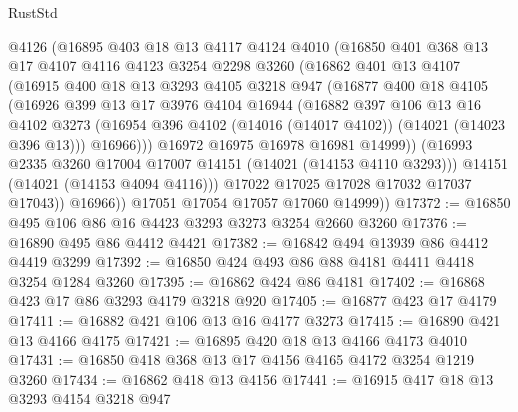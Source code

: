 \begin{lexlean}{RustStd}
\begin{coremodule}
{\begin{coremodule}
{{{{{{{{{{{{{{{{{{{{{{{{{{{{{{{{{{{{{{{              @4126
              (@16895
                @403
                @18
                @13
                @4117
                @4124
                @4010
                (@16850
                  @401
                  @368
                  @13
                  @17
                  @4107
                  @4116
                  @4123
                  @3254
                  @2298
                  @3260
                  (@16862
                    @401
                    @13
                    @4107
                    (@16915
                      @400
                      @18
                      @13
                      @3293
                      @4105
                      @3218
                      @947
                      (@16877
                        @400
                        @18
                        @4105
                        (@16926
                          @399
                          @13
                          @17
                          @3976
                          @4104
                          @16944
                          (@16882
                            @397
                            @106
                            @13
                            @16
                            @4102
                            @3273
                            (@16954 @396 @4102 (@14016 (@14017 @4102)) (@14021 (@14023 @396 @13)))
                            @16966)))
                      @16972
                      @16975
                      @16978
                      @16981
                      @14999))
                  (@16993 @2335 @3260 @17004 @17007 @14151 (@14021 (@14153 @4110 @3293)))
                  @14151
                  (@14021 (@14153 @4094 @4116)))
                @17022
                @17025
                @17028
                @17032
                @17037
                @17043))
            @16966))
        @17051
        @17054
        @17057
        @17060
        @14999))
@17372 := @16850 @495 @106 @86 @16 @4423 @3293 @3273 @3254 @2660 @3260
@17376 := @16890 @495 @86 @4412 @4421
@17382 := @16842 @494 @13939 @86 @4412 @4419 @3299
@17392 := @16850 @424 @493 @86 @88 @4181 @4411 @4418 @3254 @1284 @3260
@17395 := @16862 @424 @86 @4181
@17402 := @16868 @423 @17 @86 @3293 @4179 @3218 @920
@17405 := @16877 @423 @17 @4179
@17411 := @16882 @421 @106 @13 @16 @4177 @3273
@17415 := @16890 @421 @13 @4166 @4175
@17421 := @16895 @420 @18 @13 @4166 @4173 @4010
@17431 := @16850 @418 @368 @13 @17 @4156 @4165 @4172 @3254 @1219 @3260
@17434 := @16862 @418 @13 @4156
@17441 := @16915 @417 @18 @13 @3293 @4154 @3218 @947
}}}}}}}}}}}}}}}}}}}}}}}}}}}}}}}}}}}}}}}
\end{coremodule}}
\end{coremodule}
\end{lexlean}
